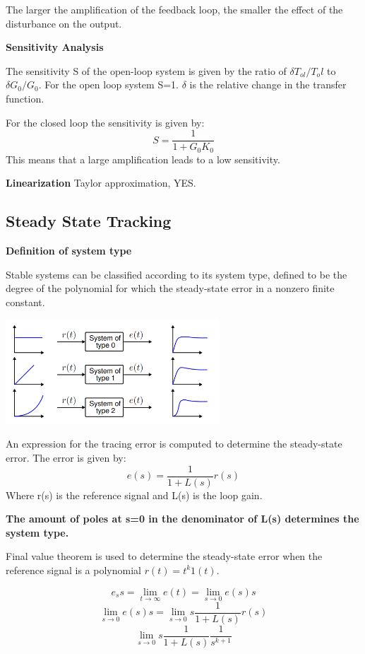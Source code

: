 The larger the amplification of the feedback loop, the smaller the effect of the
disturbance on the output.


\textbf{Sensitivity Analysis}

The sensitivity S of the open-loop system is given by the ratio of $\delta T_{ol}/T_ol$ to $\delta G_0/G_0$.
For the open loop system S=1. $\delta$ is the relative change in the transfer function.

For the closed loop the sensitivity is given by:
$$S = \frac{1}{1+G_0 K_0}$$
This means that a large amplification leads to a low sensitivity.

\textbf{Linearization}
Taylor approximation, YES.


\subsection{Steady State Tracking}

\textbf{Definition of system type}

Stable systems can be classified according to its system type, defined to be the
degree of the polynomial
for which the steady-state error in a nonzero finite constant.


\begin{center}
	\includegraphics[width=0.6\textwidth]{Images/systemTypes.png}
\end{center}


An expression for the tracing error is computed to determine the steady-state error. The error is given by:
$$e(s) = \frac{1}{1+L(s)}r(s)$$
Where r(s) is the reference signal and L(s) is the loop gain.

\textbf{The amount of poles at s=0 in the denominator of L(s) determines the system type.}

Final value theorem is used to determine the steady-state error when
the reference signal is a polynomial $r(t) = t^k 1(t)$.

$$e_ss = \lim_{t \to \infty} e(t) = \lim_{s \to 0} e(s)s$$
$$\lim_{s \to 0} e(s)s = \lim_{s \to 0} s\frac{1}{1+L(s)}r(s)$$
$$\lim_{s \to 0} s\frac{1}{1+L(s)}\frac{1}{s^{k+1}}$$

